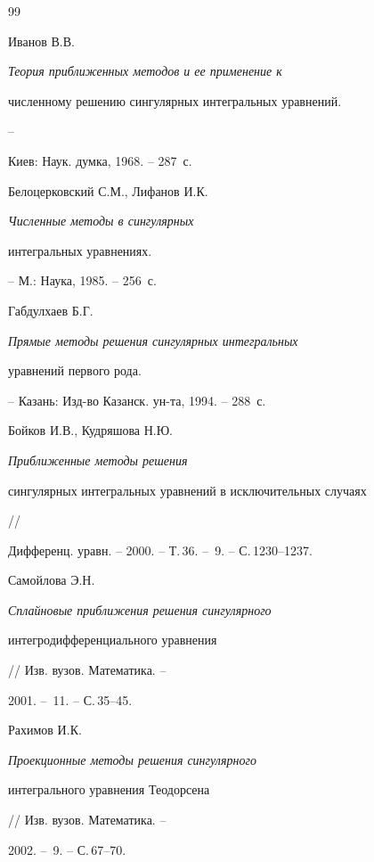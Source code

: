 \begin{thebibliography}{99}







Иванов В.В. {\it Теория приближенных методов и ее применение к


численному решению сингулярных интегральных уравнений.} --


Киев: Наук. думка, 1968. -- 287~с.







Белоцерковский С.М., Лифанов И.К. {\it Численные методы в сингулярных


интегральных уравнениях.} -- М.: Наука, 1985. -- 256~с.







Габдулхаев Б.Г. {\it Прямые методы решения сингулярных интегральных


уравнений первого рода.} -- Казань: Изд-во Казанск. ун-та, 1994. -- 288~с.







Бойков И.В., Кудряшова Н.Ю. {\it Приближенные методы решения


сингулярных интегральных уравнений в исключительных случаях} //


Дифференц. уравн. -- 2000. -- Т.\,36. -- \No\,9. -- С.\,1230--1237.







Самойлова Э.Н. {\it Сплайновые приближения решения сингулярного


интегродифференциального уравнения} // Изв. вузов. Математика. --


2001. -- \No\,11. -- С.\,35--45.







Рахимов И.К. {\it Проекционные методы решения сингулярного


интегрального уравнения Теодорсена} // Изв. вузов. Математика. --


2002. -- \No\,9. -- С.\,67--70.






\end{thebibliography}
